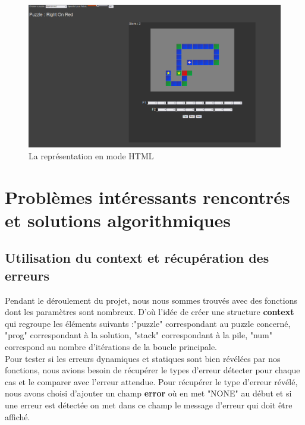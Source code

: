 \documentclass[11pt]{article}
\begin{document}
\begin{figure}[h]
    \centering
    \includegraphics[scale=0.5]{html.png}
    \caption{La représentation en mode HTML}
\end{figure}



\section{Problèmes intéressants rencontrés et solutions algorithmiques}
\subsection{Utilisation du context et récupération des erreurs}

Pendant le déroulement du projet, nous nous sommes trouvés avec des fonctions dont les paramètres sont nombreux. D'où l'idée de créer une structure \textbf{context} qui regroupe les éléments suivants  :"puzzle" correspondant au puzzle concerné, "prog" correspondant à la solution, "stack" correspondant à la pile, "num" correspond au nombre d'itérations de la boucle principale.\\

Pour tester si les erreurs dynamiques et statiques sont bien révélées par nos fonctions, nous avions besoin de récupérer le types d'erreur détecter pour chaque cas et le comparer avec l'erreur attendue. Pour récupérer le type d'erreur révélé, nous avons choisi d'ajouter un champ \textbf{error} où en met "NONE" au début et si une erreur est détectée on met dans ce champ le message d'erreur qui doit être affiché.  \\
\end{document}
